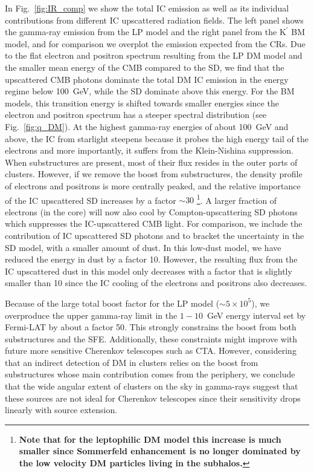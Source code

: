 \documentclass[10pt,aps,pra,reprint,amsmath,amsfonts,amssymb,showpacs,nofootinbib,floatfix]{revtex4-1}
\def\C#1{{\bf #1}}
\newcommand{\rmn}{\mathrm}
\newcommand{\Kp}{\rmn{K}^\prime}
\begin{document}
In Fig.~\ref{fig:IR_comp} we show the total IC emission as well as its
individual contributions from different IC upscattered radiation
fields. The left panel shows the gamma-ray emission from the LP model
and the right panel from the $\Kp$ BM model, and for comparison we
overplot the emission expected from the CRs. Due to the flat electron
and positron spectrum resulting from the LP DM model and the smaller
mean energy of the CMB compared to the SD, we find that the
upscattered CMB photons dominate the total DM IC emission in the
energy regime below 100~GeV, while the SD dominate above this
energy. For the BM models, this transition energy is shifted towards
smaller energies since the electron and positron spectrum has a
steeper spectral distribution (see Fig.~\ref{fig:q_DM}). At the
highest gamma-ray energies of about 100~GeV and above, the IC from
starlight steepens because it probes the high energy tail of the
electrons and more importantly, it suffers from the Klein-Nishina
suppression. When substructures are present, most of their flux
resides in the outer parts of clusters. However, if we remove the
boost from substructures, the density profile of electrons and
positrons is more centrally peaked, and the relative importance of the
IC upscattered SD increases by a factor $\sim 30$ \footnote{\C{Note
    that for the leptophilic DM model this increase is much smaller
    since Sommerfeld enhancement is no longer dominated by the low
    velocity DM particles living in the subhalos.}}.  A larger
fraction of electrons (in the core) will now also cool by
Compton-upscattering SD photons which suppresses the IC-upscattered
CMB light.  For comparison, we include the contribution of IC
upscattered SD photons and to bracket the uncertainty in the SD model,
with a smaller amount of dust. In this low-dust model, we have reduced
the energy in dust by a factor 10. However, the resulting flux from
the IC upscattered dust in this model only decreases with a factor
that is slightly smaller than 10 since the IC cooling of the electrons
and positrons also decreases.

Because of the large total boost factor for the LP model ($\sim5\times
10^5$), we overproduce the upper gamma-ray limit in the $1-10$~GeV
energy interval set by Fermi-LAT by about a factor 50. This strongly
constrains the boost from both substructures and the
SFE. Additionally, these constraints might improve with future more
sensitive Cherenkov telescopes such as CTA. However, considering that
an indirect detection of DM in clusters relies on the boost from
substructures whose main contribution comes from the periphery, we
conclude that the wide angular extent of clusters on the sky in
gamma-rays suggest that these sources are not ideal for Cherenkov
telescopes since their sensitivity drops linearly with source
extension.
\end{document}
